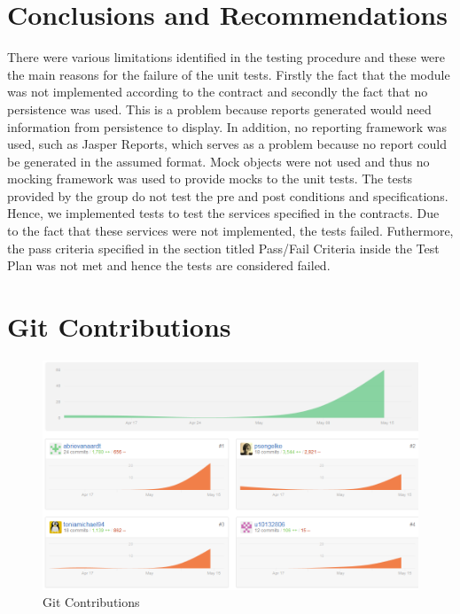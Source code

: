 \section{Conclusions and Recommendations}
\label{sec:conclusions}
There were various limitations identified in the testing procedure and these were the main reasons for the failure of the unit tests. Firstly the fact that the module was not implemented according to the contract and secondly the fact that no persistence was used. This is a problem because reports generated would need information from persistence to display. In addition, no reporting framework was used, such as Jasper Reports, which serves as a problem because no report could be generated in the assumed format. Mock objects were not used and thus no mocking framework was used to provide mocks to the unit tests. The tests provided by the group do not test the pre and post conditions and specifications. Hence, we implemented tests to test the services specified in the contracts. Due to the fact that these services were not implemented, the tests failed. Futhermore, the pass criteria specified in the section titled Pass/Fail Criteria inside the Test Plan was not met and hence the tests are considered failed. 

\newpage
\appendix
\section{Git Contributions}
\begin{figure}[h!]
	\includegraphics[scale=0.6]{./figures/gitGraph.PNG}
	\caption{Git Contributions}
\end{figure}
 
  
